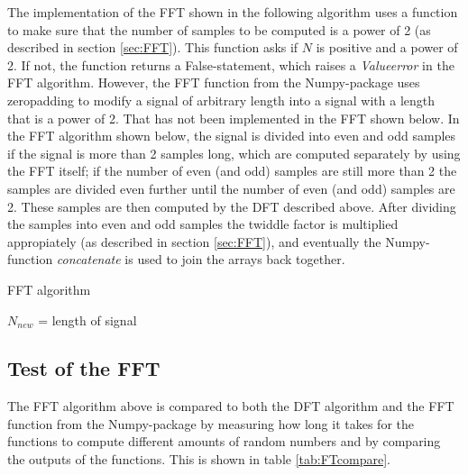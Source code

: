 The implementation of the FFT shown in the following algorithm uses a function to make sure that the number of samples to be computed is a power of 2 (as described in section \ref{sec:FFT}). This function asks if $N$ is positive and a power of 2. If not, the function returns a False-statement, which raises a \textit{Valueerror} in the FFT algorithm. However, the FFT function from the Numpy-package uses zeropadding to modify a signal of arbitrary length into a signal with a length that is a power of 2. That has not been implemented in the FFT shown below. In the FFT algorithm shown below, the signal is divided into even and odd samples if the signal is more than 2 samples long, which are computed separately by using the FFT itself; if the number of even (and odd) samples are still more than 2 the samples are divided even further until the number of even (and odd) samples are 2. These samples are then computed by the DFT described above. After dividing the samples into even and odd samples the twiddle factor is multiplied appropiately (as described in section \ref{sec:FFT}), and eventually the Numpy-function \textit{concatenate} is used to join the arrays back together.
\begin{algorithm}
\caption{FFT algorithm}
\label{FFTalg}
\begin{algorithmic}[1]

\EndProcedure

	\State $N_{new}$ = length of signal 
	\Else
		 
		 
		 
	\EndIf
\EndProcedure
\end{algorithmic}
\end{algorithm}

\subsection{Test of the FFT}
The FFT algorithm above is compared to both the DFT algorithm and the FFT function from the Numpy-package by measuring how long it takes for the functions to compute different amounts of random numbers and by comparing the outputs of the functions. This is shown in table \ref{tab:FTcompare}.

